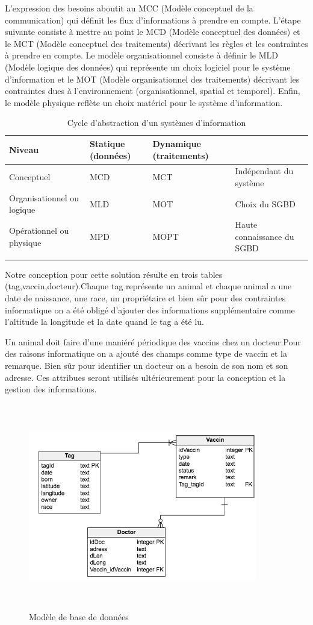 \documentclass[11pt, a4paper, twoside]{book}
\begin{document}
L'expression des besoins aboutit au MCC (Modèle conceptuel de la communication) qui définit les flux d'informations à prendre en compte.
L'étape suivante consiste à mettre au point le MCD (Modèle conceptuel des données) et le MCT (Modèle conceptuel des traitements) décrivant les règles et les contraintes à prendre en compte.
Le modèle organisationnel consiste à définir le MLD (Modèle logique des données) qui représente un choix logiciel pour le système d'information et le MOT (Modèle organisationnel des traitements) décrivant les contraintes dues à l'environnement (organisationnel, spatial et temporel).
Enfin, le modèle physique reflète un choix matériel pour le système d'information. 


\begin{longtable}{|p{}|p{}|p{}| p{}|}
\hline
\textbf{Niveau } & \textbf{Statique (données) } & \textbf{Dynamique (traitements) } & \\
\hline
Conceptuel  & MCD & MCT  & Indépendant du système \\
\hline
Organisationnel ou logique  & MLD & MOT & Choix du SGBD
 \\
\hline
Opérationnel
ou physique  & MPD  & MOPT  & Haute connaissance du
SGBD \\
\hline
\caption{Cycle d'abstraction d'un systèmes d'information}
\end{longtable}

Notre conception pour cette solution résulte en trois tables (tag,vaccin,docteur).Chaque tag représente un animal et chaque animal a une date de naissance, une race, un propriétaire et bien sûr pour des contraintes informatique on a été obligé  d'ajouter des informations supplémentaire comme l'altitude la longitude et la date quand le tag a été lu.

Un animal doit faire d'une maniéré périodique des vaccins chez un docteur.Pour des raisons informatique on a ajouté des champs comme type de vaccin et la remarque. Bien sûr pour identifier un docteur on a besoin de son nom et son adresse. Ces attribues seront utilisés ultérieurement pour la conception et la gestion des informations.

\begin{figure}[!h]
\centering
\includegraphics[width=10cm,height=9cm]{ddb}
\caption{Modèle de base de données}
\end{figure}
\end{document}
